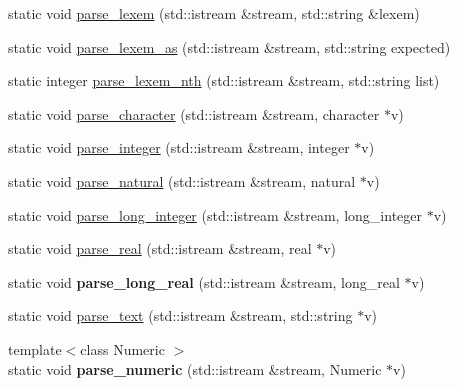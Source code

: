 \begin{DoxyCompactItemize}
\item 
static void \hyperlink{classez_1_1objects_1_1ObjectSerializer_ae121be9b0887d5b43039d053e4b6cb65}{parse\+\_\+lexem} (std\+::istream \&stream, std\+::string \&lexem)
\item 
static void \hyperlink{classez_1_1objects_1_1ObjectSerializer_ad107ac3c87034f219755a1309420494c}{parse\+\_\+lexem\+\_\+as} (std\+::istream \&stream, std\+::string expected)
\item 
static integer \hyperlink{classez_1_1objects_1_1ObjectSerializer_adec5d6150d5944b7a5b3899e3b17d074}{parse\+\_\+lexem\+\_\+nth} (std\+::istream \&stream, std\+::string list)
\item 
static void \hyperlink{classez_1_1objects_1_1ObjectSerializer_a71dd48f69cbcb3321ab1f01b4c629c44}{parse\+\_\+character} (std\+::istream \&stream, character $\ast$v)
\item 
static void \hyperlink{classez_1_1objects_1_1ObjectSerializer_a34008fa22db3c164b5d7eef2b991ed0f}{parse\+\_\+integer} (std\+::istream \&stream, integer $\ast$v)
\item 
static void \hyperlink{classez_1_1objects_1_1ObjectSerializer_a9019cc0ebd7ea59945af0f77fe819e5b}{parse\+\_\+natural} (std\+::istream \&stream, natural $\ast$v)
\item 
static void \hyperlink{classez_1_1objects_1_1ObjectSerializer_a591158e6375b60f82c58294a866263f8}{parse\+\_\+long\+\_\+integer} (std\+::istream \&stream, long\+\_\+integer $\ast$v)
\item 
static void \hyperlink{classez_1_1objects_1_1ObjectSerializer_a9f7293c4f1154b1e4a34c62838f5e00c}{parse\+\_\+real} (std\+::istream \&stream, real $\ast$v)
\item 
\mbox{\label{classez_1_1objects_1_1ObjectSerializer_a4710607198a3789c4eb3379064ab39ef}} 
static void {\bfseries parse\+\_\+long\+\_\+real} (std\+::istream \&stream, long\+\_\+real $\ast$v)
\item 
static void \hyperlink{classez_1_1objects_1_1ObjectSerializer_a6c36b150271e3e410c52e6bb7f14c55c}{parse\+\_\+text} (std\+::istream \&stream, std\+::string $\ast$v)
\item 
\mbox{\label{classez_1_1objects_1_1ObjectSerializer_a76600bd7cb8190ece6339ebd4805dd1b}} 
{\footnotesize template$<$class Numeric $>$ }\\static void {\bfseries parse\+\_\+numeric} (std\+::istream \&stream, Numeric $\ast$v)

\end{DoxyCompactItemize}
